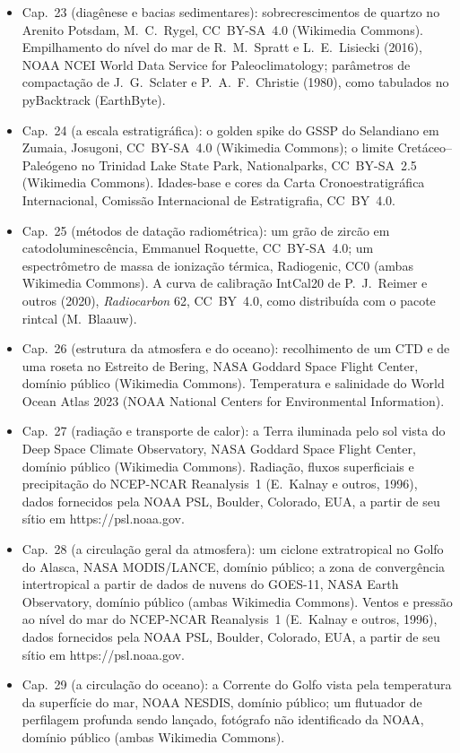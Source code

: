 \begin{itemize}
  \item Cap.~23 (diagênese e bacias sedimentares): sobrecrescimentos de quartzo no Arenito Potsdam, M.~C.~Rygel, CC~BY-SA~4.0 (Wikimedia Commons). Empilhamento do nível do mar de R.~M.~Spratt e L.~E.~Lisiecki (2016), NOAA NCEI World Data Service for Paleoclimatology; parâmetros de compactação de J.~G.~Sclater e P.~A.~F.~Christie (1980), como tabulados no pyBacktrack (EarthByte).
  \item Cap.~24 (a escala estratigráfica): o golden spike do GSSP do Selandiano em Zumaia, Josugoni, CC~BY-SA~4.0 (Wikimedia Commons); o limite Cretáceo--Paleógeno no Trinidad Lake State Park, Nationalparks, CC~BY-SA~2.5 (Wikimedia Commons). Idades-base e cores da Carta Cronoestratigráfica Internacional, Comissão Internacional de Estratigrafia, CC~BY~4.0.
  \item Cap.~25 (métodos de datação radiométrica): um grão de zircão em catodoluminescência, Emmanuel Roquette, CC~BY-SA~4.0; um espectrômetro de massa de ionização térmica, Radiogenic, CC0 (ambas Wikimedia Commons). A curva de calibração IntCal20 de P.~J.~Reimer e outros (2020), \emph{Radiocarbon} 62, CC~BY~4.0, como distribuída com o pacote rintcal (M.~Blaauw).
  \item Cap.~26 (estrutura da atmosfera e do oceano): recolhimento de um CTD e de uma roseta no Estreito de Bering, NASA Goddard Space Flight Center, domínio público (Wikimedia Commons). Temperatura e salinidade do World Ocean Atlas 2023 (NOAA National Centers for Environmental Information).
  \item Cap.~27 (radiação e transporte de calor): a Terra iluminada pelo sol vista do Deep Space Climate Observatory, NASA Goddard Space Flight Center, domínio público (Wikimedia Commons). Radiação, fluxos superficiais e precipitação do NCEP-NCAR Reanalysis~1 (E.~Kalnay e outros, 1996), dados fornecidos pela NOAA PSL, Boulder, Colorado, EUA, a partir de seu sítio em https://psl.noaa.gov.
  \item Cap.~28 (a circulação geral da atmosfera): um ciclone extratropical no Golfo do Alasca, NASA MODIS/LANCE, domínio público; a zona de convergência intertropical a partir de dados de nuvens do GOES-11, NASA Earth Observatory, domínio público (ambas Wikimedia Commons). Ventos e pressão ao nível do mar do NCEP-NCAR Reanalysis~1 (E.~Kalnay e outros, 1996), dados fornecidos pela NOAA PSL, Boulder, Colorado, EUA, a partir de seu sítio em https://psl.noaa.gov.
  \item Cap.~29 (a circulação do oceano): a Corrente do Golfo vista pela temperatura da superfície do mar, NOAA NESDIS, domínio público; um flutuador de perfilagem profunda sendo lançado, fotógrafo não identificado da NOAA, domínio público (ambas Wikimedia Commons).
\end{itemize}
